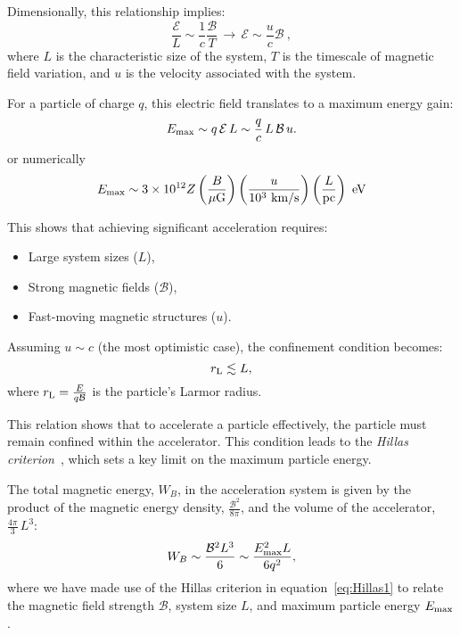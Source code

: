 Dimensionally, this relationship implies:
\begin{equation}
\frac{\mathcal E}{L} \sim \frac{1}{c} \frac{\mathcal B}{T} \, \longrightarrow \, \mathcal E \sim \frac{u}{c} \mathcal B~,
\end{equation}
where \( L \) is the characteristic size of the system, \( T \) is the timescale of magnetic field variation, and \( u \) is the velocity associated with the system.

For a particle of charge \( q \), this electric field translates to a maximum energy gain:
\begin{equation}\label{eq:Hillas1}
E_{\rm max} \sim q \, \mathcal E \, L \sim \frac{q}{c} \, L \, \mathcal B \, u.
\end{equation}
or numerically
\[
E_{\rm max} \sim 3 \times 10^{12} Z \left( \frac{B}{\mu\text{G}} \right) \left( \frac{u}{10^3~\text{km/s}} \right) \left( \frac{L}{\text{pc}} \right)~\text{eV}
\]

This shows that achieving significant acceleration requires:
%
\begin{itemize}
\item Large system sizes (\( L \)),
\item Strong magnetic fields (\( \mathcal B \)),
\item Fast-moving magnetic structures (\( u \)).
\end{itemize}

Assuming \( u \sim c \) (the most optimistic case), the confinement condition becomes:
\begin{equation}
r_{\rm L} \lesssim L,
\end{equation}
where \( r_{\rm L} = \frac{E}{q \mathcal B} \) is the particle's Larmor radius. 

This relation shows that to accelerate a particle effectively, the particle must remain confined within the accelerator. 
%
This condition leads to the \emph{Hillas criterion}~\cite{Hillas1984}, which sets a key limit on the maximum particle energy. 

The total magnetic energy, \( W_B \), in the acceleration system is given by the product of the magnetic energy density, \( \frac{\mathcal{B}^2}{8\pi} \), and the volume of the accelerator, \( \frac{4\pi}{3} \, L^3 \):  
\begin{equation}
W_B \sim \frac{\mathcal{B}^2 L^3}{6} \sim \frac{E_{\rm max}^2 L}{6 q^2},
\end{equation}
where we have made use of the Hillas criterion in equation~\ref{eq:Hillas1} to relate the magnetic field strength \( \mathcal{B} \), system size \( L \), and maximum particle energy \( E_{\rm max} \).  

